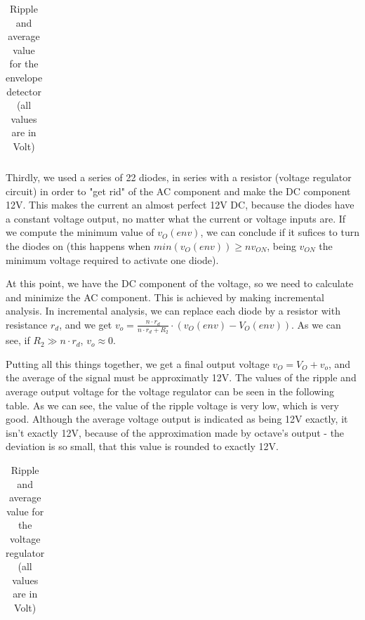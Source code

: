 \vspace{5mm}
\begin{table}[H]
\centering
\begin{tabularx}{0.9\textwidth} {
  | >{\raggedright\arraybackslash}X
  | >{\raggedleft\arraybackslash}X | }
 \hline

\end{tabularx}
\caption{\label{tab:Table 1} Ripple and average value for the envelope detector (all values are in Volt)}
\end{table}
\vspace{5mm}

\par Thirdly, we used a series of 22 diodes, in series with a resistor (voltage regulator circuit) in order to "get rid" of the AC component and make the DC component 12V. This makes the current an almost perfect 12V DC, because the diodes have a constant voltage output, no matter what the current or voltage inputs are. If we compute the minimum value of $v_O(env)$, we can conclude if it sufices to turn the diodes on (this happens when $min(v_O(env)) \geq nv_{ON}$, being $v_{ON}$ the minimum voltage required to activate one diode).
\par At this point, we have the DC component of the voltage, so we need to calculate and minimize the AC component. This is achieved by making incremental analysis. In incremental analysis, we can replace each diode by a resistor with resistance $r_d$, and we get $v_o = \frac{n \cdot r_d}{n \cdot r_d+R_2} \cdot (v_O(env)-V_O(env))$. As we can see, if $R_2 \gg n \cdot r_d$, $v_o \approx 0$.
\par Putting all this things together, we get a final output voltage $v_O=V_O+v_o$, and the average of the signal must be approximatly 12V. The values of the ripple and average output voltage for the voltage regulator can be seen in the following table. As we can see, the value of the ripple voltage is very low, which is very good. Although the average voltage output is indicated as being 12V exactly, it isn't exactly 12V, because of the approximation made by octave's output - the deviation is so small, that this value is rounded to exactly 12V.

\vspace{5mm}
\begin{table}[H]
\centering
\begin{tabularx}{0.9\textwidth} {
  | >{\raggedright\arraybackslash}X
  | >{\raggedleft\arraybackslash}X | }
 \hline

\end{tabularx}
\caption{\label{tab:Table 2} Ripple and average value for the voltage regulator (all values are in Volt)}
\end{table}
\vspace{5mm}

